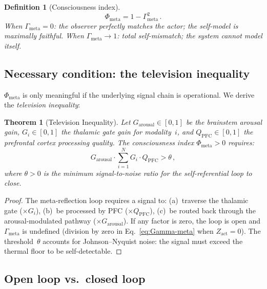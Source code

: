 \documentclass[aps,pre,twocolumn,superscriptaddress,floatfix]{revtex4-2}
\newtheorem{theorem}{Theorem}
\newtheorem{definition}{Definition}
\newcommand{\Gmeta}{\Gamma_{\text{meta}}}
\newcommand{\Phimeta}{\Phi_{\text{meta}}}
\newcommand{\Zarousal}{G_{\text{arousal}}}
\newcommand{\QPFC}{Q_{\text{PFC}}}
\begin{document}
\begin{definition}[Consciousness index]
\begin{equation}
  \Phimeta = 1 - \Gmeta^2\,.
  \label{eq:Phi-meta}
\end{equation}
When $\Gmeta=0$: the observer perfectly matches the actor;
the self-model is maximally faithful.
When $\Gmeta\to 1$: total self-mismatch; the system cannot
model itself.
\end{definition}

\subsection{Necessary condition: the television inequality}

$\Phimeta$ is only meaningful if the underlying signal chain
is operational.  We derive the \emph{television inequality}:

\begin{theorem}[Television Inequality]
\label{thm:television}
Let $\Zarousal\in[0,1]$ be the brainstem arousal gain,
$G_i\in[0,1]$ the thalamic gate gain for modality~$i$,
and $\QPFC\in[0,1]$ the prefrontal cortex processing
quality.  The consciousness index $\Phimeta>0$ requires:
\begin{equation}
  \Zarousal \cdot \sum_{i=1}^{N} G_i \cdot \QPFC > \theta\,,
  \label{eq:TV-inequality}
\end{equation}
where $\theta>0$ is the minimum signal-to-noise ratio for
the self-referential loop to close.
\end{theorem}

\begin{proof}
The meta-reflection loop requires a signal to:
(a)~traverse the thalamic gate ($\times G_i$),
(b)~be processed by PFC ($\times\QPFC$),
(c)~be routed back through the arousal-modulated pathway
($\times\Zarousal$).
If any factor is zero, the loop is open and $\Gmeta$ is
undefined (division by zero in Eq.~\ref{eq:Gamma-meta}
when $Z_{\text{act}}=0$).
The threshold~$\theta$ accounts for Johnson--Nyquist noise:
the signal must exceed the thermal floor to be self-detectable.
\end{proof}

\subsection{Open loop vs.\ closed loop}
\end{document}
